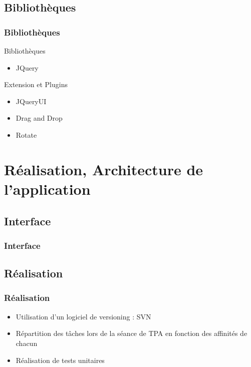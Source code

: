 \documentclass[11pt]{beamer}
\begin{document}
\subsection{Bibliothèques}
\begin{frame}
\frametitle{Bibliothèques}
\begin{block}{Bibliothèques}
\begin{itemize}
\item JQuery
\end{itemize}
\end{block}
\begin{exampleblock}{Extension et Plugins}
\begin{itemize}
\item JQueryUI
\item Drag and Drop
\item Rotate
\end{itemize}
\end{exampleblock}
\begin{figure}
\end{figure}
\end{frame}


\section{Réalisation, Architecture de l'application}

\subsection{Interface}
\begin{frame}
\frametitle{Interface}
\begin{figure}
\end{figure}
\end{frame}

\subsection{Réalisation}
\begin{frame}
\frametitle{Réalisation}
\begin{itemize}
\item Utilisation d'un logiciel de versioning : SVN
\item Répartition des tâches lors de la séance de TPA en fonction des affinités de chacun
\item Réalisation de tests unitaires
\end{itemize}
\end{frame}
\end{document}
